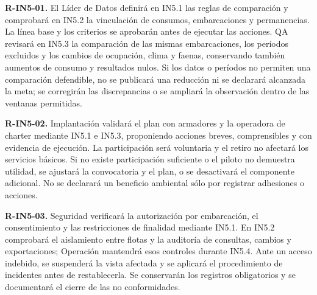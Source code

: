 
\medskip
\noindent\textbf{R-IN5-01.}
El Líder de Datos definirá en IN5.1 las reglas de comparación
y comprobará en IN5.2 la vinculación de consumos, embarcaciones
y permanencias. La línea base y los criterios se aprobarán antes
de ejecutar las acciones. QA revisará en IN5.3 la comparación
de las mismas embarcaciones, los períodos excluidos y los cambios
de ocupación, clima y faenas, conservando también aumentos
de consumo y resultados nulos. Si los datos o períodos no permiten
una comparación defendible, no se publicará una reducción
ni se declarará alcanzada la meta; se corregirán las discrepancias
o se ampliará la observación dentro de las ventanas permitidas.

\medskip
\noindent\textbf{R-IN5-02.}
Implantación validará el plan con armadores y la operadora
de charter mediante IN5.1 e IN5.3, proponiendo acciones breves,
comprensibles y con evidencia de ejecución. La participación
será voluntaria y el retiro no afectará los servicios básicos.
Si no existe participación suficiente o el piloto no demuestra
utilidad, se ajustará la convocatoria y el plan, o se desactivará
el componente adicional. No se declarará un beneficio ambiental
sólo por registrar adhesiones o acciones.

\medskip
\noindent\textbf{R-IN5-03.}
Seguridad verificará la autorización por embarcación,
el consentimiento y las restricciones de finalidad mediante
IN5.1. En IN5.2 comprobará el aislamiento entre flotas
y la auditoría de consultas, cambios y exportaciones;
Operación mantendrá esos controles durante IN5.4.
Ante un acceso indebido, se suspenderá la vista afectada
y se aplicará el procedimiento de incidentes antes de
restablecerla. Se conservarán los registros obligatorios
y se documentará el cierre de las no conformidades.

